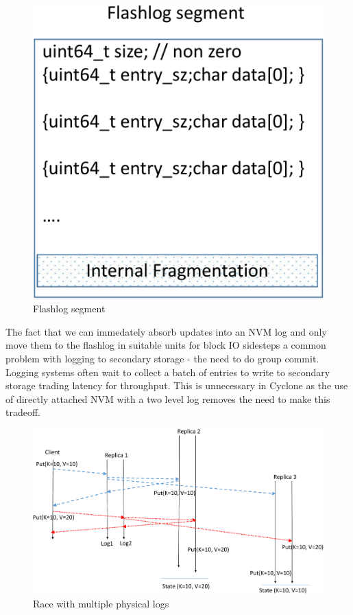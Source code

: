 \documentclass[10pt, preprint, nonatbib]{sigplanconf}
\begin{document}
\begin{figure}
  \centering
  \includegraphics[scale=0.4]{figures2/flashlog_page.pdf}
  \caption{Flashlog segment}
  \label{fig:flashlog_page}
\end{figure}

The fact that we can immedately absorb updates into an NVM log and only move
them to the flashlog in suitable units for block IO sidesteps a common problem
with logging to secondary storage - the need to do group commit. Logging systems
often wait to collect a batch of entries to write to secondary storage trading
latency for throughput. This is unnecessary in Cyclone as the use of directly
attached NVM with a two level log removes the need to make this tradeoff.

\begin{figure}
  \centering
  \includegraphics[scale=0.35]{figures2/race.pdf}
  \caption{Race with multiple physical logs}
  \label{fig:race}
\end{figure}
\end{document}
